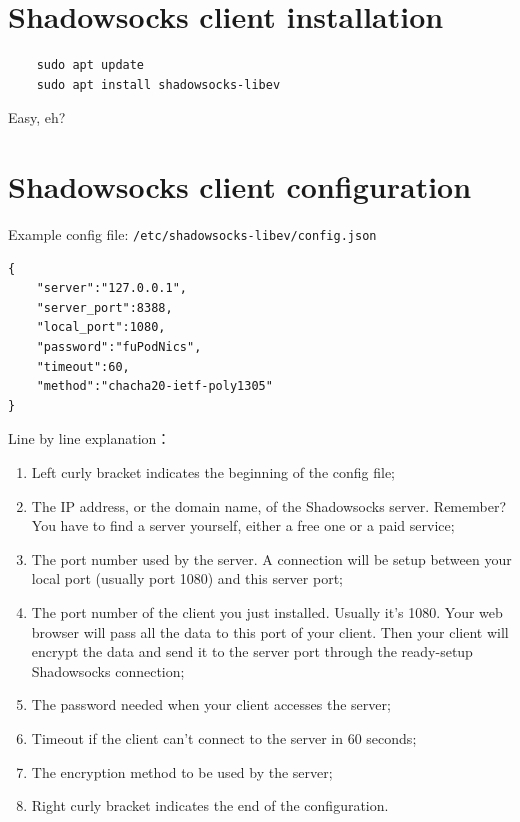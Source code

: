 \documentclass[12pt]{wx672article}
\begin{document}
\section{Shadowsocks client installation}

\begin{verbatim}
    sudo apt update
    sudo apt install shadowsocks-libev
\end{verbatim}
Easy, eh?

\section{Shadowsocks client configuration}

Example config file: \texttt{/etc/shadowsocks-libev/config.json}

\begin{verbatim}
{
    "server":"127.0.0.1",
    "server_port":8388,
    "local_port":1080,
    "password":"fuPodNics",
    "timeout":60,
    "method":"chacha20-ietf-poly1305"
}
\end{verbatim}

Line by line explanation：
\begin{enumerate}
\item Left curly bracket indicates the beginning of the config file;
\item The IP address, or the domain name, of the Shadowsocks server. Remember? You have to
find a server yourself, either a free one or a paid service;
\item The port number used by the server. A connection will be setup between your local port
(usually port 1080) and this server port;
\item The port number of the client you just installed. Usually it's 1080. Your web browser
will pass all the data to this port of your client. Then your client will encrypt
the data and send it to the server port through the ready-setup Shadowsocks
connection;
\item The password needed when your client accesses the server;
\item Timeout if the client can't connect to the server in 60 seconds;
\item The encryption method to be used by the server;
\item Right curly bracket indicates the end of the configuration.
\end{enumerate}
\end{document}
